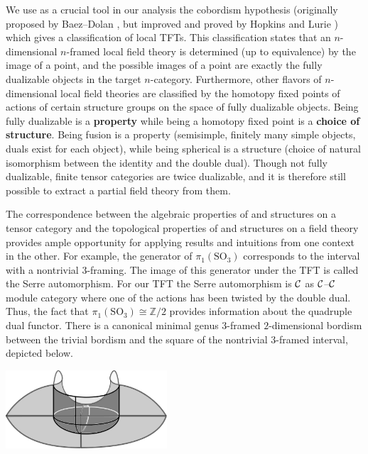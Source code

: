 \documentclass{amsart}
\begin{document}
We use as a crucial tool in our analysis the cobordism hypothesis (originally proposed by Baez--Dolan \cite{MR1355899}, but improved and proved by Hopkins and Lurie \cite{0905.0465}) which gives a classification of local TFTs.  This classification states that an $n$-dimensional $n$-framed local field theory is determined (up to equivalence) by the image of a point, and the possible images of a point are exactly the fully dualizable objects in the target $n$-category.  Furthermore, other flavors of $n$-dimensional local field theories are classified by the homotopy fixed points of actions of certain structure groups on the space of fully dualizable objects.  Being fully dualizable is a {\bf property} while being a homotopy fixed point is a {\bf choice of structure}.  Being fusion is a property (semisimple, finitely many simple objects, duals exist for each object), while being spherical is a structure (choice of natural isomorphism between the identity and the double dual).  Though not fully dualizable, finite tensor categories are twice dualizable, and it is therefore still possible to extract a partial field theory from them.

The correspondence between the algebraic properties of and structures on a tensor category and the topological properties of and structures on a field theory provides ample opportunity for applying results and intuitions from one context in the other.  For example, the generator of $\pi_1(\mathrm{SO}_3)$ corresponds to the interval with a nontrivial $3$-framing.  The image of this generator under the TFT is called the Serre automorphism.  For our TFT the Serre automorphism is $\mathcal C$ as $\mathcal C$--$\mathcal C$ module category where one of the actions has been twisted by the double dual.  Thus, the fact that $\pi_1(\mathrm{SO}_3) \cong \mathbb{Z}/2$ provides information about the quadruple dual functor.  There is a canonical minimal genus $3$-framed $2$-dimensional bordism between the trivial bordism and the square of the nontrivial $3$-framed interval, depicted below.

\begin{center}
\includegraphics[width=60mm]{cobordism.png}
\end{center}
\end{document}

